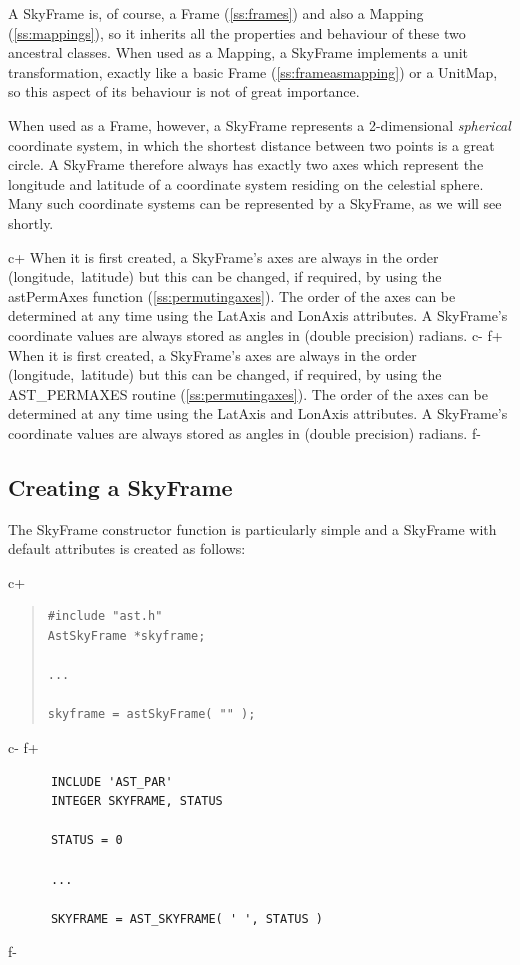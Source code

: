 \documentclass[twoside,11pt]{article}
\newcommand{\secref}[1]{\S\ref{#1}}
\renewcommand{\secref}[1]{\ref{#1}}
\begin{document}
A SkyFrame is, of course, a Frame (\secref{ss:frames}) and also a
Mapping (\secref{ss:mappings}), so it inherits all the properties and
behaviour of these two ancestral classes.  When used as a Mapping, a
SkyFrame implements a unit transformation, exactly like a basic Frame
(\secref{ss:frameasmapping}) or a UnitMap, so this aspect of its
behaviour is not of great importance.

When used as a Frame, however, a SkyFrame represents a 2-dimensional
{\em{spherical}} coordinate system, in which the shortest distance
between two points is a great circle.  A SkyFrame therefore always has
exactly two axes which represent the longitude and latitude of a
coordinate system residing on the celestial sphere. Many such
coordinate systems can be represented by a SkyFrame, as we will see
shortly.

c+
When it is first created, a SkyFrame's axes are always in the order
(longitude,~latitude) but this can be changed, if required, by using the
astPermAxes function (\secref{ss:permutingaxes}). The order of the axes
can be determined at any time using the LatAxis and LonAxis attributes. A
SkyFrame's coordinate values are always stored as angles in (double
precision) radians.
c-
f+
When it is first created, a SkyFrame's axes are always in the order
(longitude,~latitude) but this can be changed, if required, by using the
AST\_PERMAXES routine (\secref{ss:permutingaxes}). The order of the axes
can be determined at any time using the LatAxis and LonAxis attributes. A
SkyFrame's coordinate values are always stored as angles in (double
precision) radians.
f-

\subsection{Creating a SkyFrame}

The SkyFrame constructor function is particularly simple and a
SkyFrame with default attributes is created as follows:

c+
\begin{quote}
\small
\begin{verbatim}
#include "ast.h"
AstSkyFrame *skyframe;

...

skyframe = astSkyFrame( "" );
\end{verbatim}
\normalsize
\end{quote}
c-
f+
\small
\begin{verbatim}
      INCLUDE 'AST_PAR'
      INTEGER SKYFRAME, STATUS

      STATUS = 0

      ...

      SKYFRAME = AST_SKYFRAME( ' ', STATUS )
\end{verbatim}
\normalsize
f-
\end{document}
